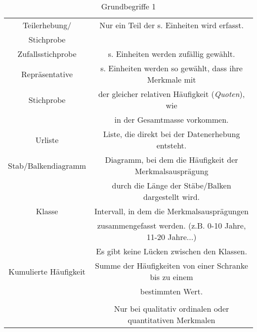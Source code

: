 \documentclass[12pt]{scrartcl}
\begin{document}
\begin{table}[h]
\begin{tabular}{ | c | c | }
        \hline
        Teilerhebung/          & Nur ein Teil der s. Einheiten wird erfasst.               \\
        Stichprobe             &                                                           \\
        \hline
        Zufallsstichprobe      & s. Einheiten werden zufällig gewählt.                     \\
        \hline
        Repräsentative         & s. Einheiten werden so gewählt, dass ihre Merkmale mit    \\
        Stichprobe             & der gleicher relativen Häufigkeit (\emph{Quoten}), wie    \\
                               & in der Gesamtmasse vorkommen.                             \\
        \hline
        Urliste                & Liste, die direkt bei der Datenerhebung entsteht.         \\
        \hline
        Stab/Balkendiagramm    & Diagramm, bei dem die Häufigkeit der Merkmalsausprägung   \\
                               & durch die Länge der Stäbe/Balken dargestellt wird.        \\
        \hline
        Klasse                 & Intervall, in dem die Merkmalsausprägungen                \\
                               & zusammengefasst werden. (z.B. 0-10 Jahre, 11-20 Jahre...) \\
                               & Es gibt keine Lücken zwischen den Klassen.                \\
        \hline
        Kumulierte Häufigkeit  & Summe der Häufigkeiten von einer Schranke bis zu einem    \\
                               & bestimmten Wert.                                          \\&\\
                               & Nur bei qualitativ ordinalen oder quantitativen Merkmalen \\
        \hline
    \end{tabular}
    \caption{Grundbegriffe 1}
\end{table}
\pagebreak
\end{document}
